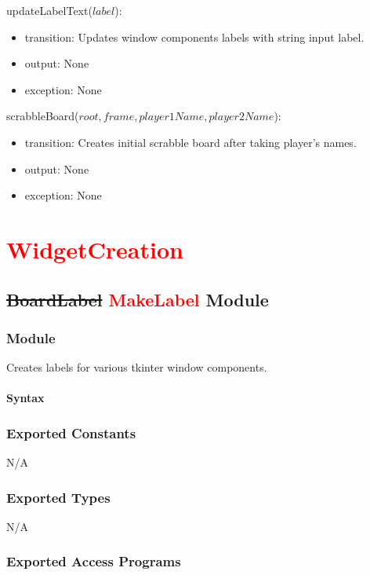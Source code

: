\documentclass[12pt]{article}
\begin{document}
\noindent updateLabelText($label$):
\begin{itemize}
\item transition: Updates window components labels with string input label.
\item output: None
\item exception: None
\end{itemize}

\noindent scrabbleBoard($root, frame, player1Name, player2Name$):
\begin{itemize}
\item transition: Creates initial scrabble board after taking player's names.
\item output: None
\item exception: None
\end{itemize}

\section*{\textcolor{red}{WidgetCreation}}

\subsection*{\sout{BoardLabel} \textcolor{red}{MakeLabel} Module}

\subsubsection*{Module}

Creates labels for various tkinter window components.

\paragraph*{Syntax}

\subsubsection*{Exported Constants}
N/A
\subsubsection*{Exported Types}

N/A

\subsubsection* {Exported Access Programs}
\end{document}
